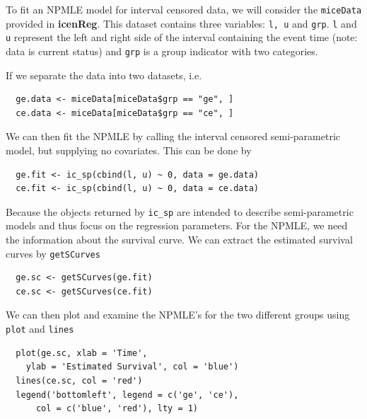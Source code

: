 \documentclass[11pt]{report}
\begin{document}
  To fit an NPMLE model for interval censored data, we will consider the \texttt{miceData}
  provided in {\bf icenReg}. This dataset contains three variables: \texttt{l, u} and
  \texttt{grp}. \texttt{l} and \texttt{u} represent the left and right side of the interval
  containing the event time (note: data is current status) and \texttt{grp} is a group
  indicator with two categories.
  
  If we separate the data into two datasets, i.e. 
  
  \begin{verbatim}
  ge.data <- miceData[miceData$grp == "ge", ]
  ce.data <- miceData[miceData$grp == "ce", ]
  \end{verbatim}

  We can then fit the NPMLE by calling the interval censored semi-parametric model, 
  but supplying no covariates. This can be done by 
  
  \begin{verbatim}
  ge.fit <- ic_sp(cbind(l, u) ~ 0, data = ge.data)
  ce.fit <- ic_sp(cbind(l, u) ~ 0, data = ce.data)
  \end{verbatim}

  Because the objects returned by \texttt{ic\_sp} are intended
  to describe semi-parametric models and thus focus on the 
  regression parameters. For the NPMLE, we need the information
  about the survival curve. 
  We can extract the estimated survival curves by \texttt{getSCurves}
  
  \begin{verbatim}
  ge.sc <- getSCurves(ge.fit)
  ce.sc <- getSCurves(ce.fit)
  \end{verbatim}

  We can then plot and examine the NPMLE's for the two different groups
  using \texttt{plot} and \texttt{lines}
  
  \begin{verbatim}
  plot(ge.sc, xlab = 'Time', 
    ylab = 'Estimated Survival', col = 'blue')
  lines(ce.sc, col = 'red')
  legend('bottomleft', legend = c('ge', 'ce'), 
      col = c('blue', 'red'), lty = 1)
  \end{verbatim}
\end{document}
